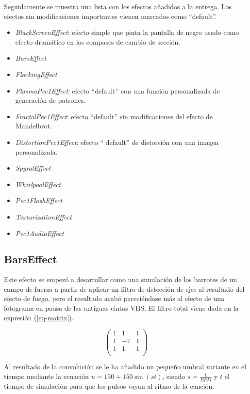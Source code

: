 \documentclass[12pt]{article}%
\begin{document}
	Seguidamente se muestra una lista con los efectos añadidos a la entrega. Los efectos sin modificaciones importantes vienen marcados como ``default''.
	
	\begin{itemize}
		\item \textit{BlackScreenEffect}: efecto simple que pinta la pantalla de negro usado como efecto dramático en los compases de cambio de sección.
		\item \textit{BarsEffect}
		\item \textit{FlockingEffect}
		\item \textit{PlasmaPec1Effect}: efecto ``default'' con una función personalizada de generación de patrones.
		\item \textit{FractalPec1Effect}: efecto ``default'' sin modificaciones del efecto de Mandelbrot.
		\item \textit{DistortionPec1Effect}: efecto `` default'' de distorsión con una imagen personalizada.
		\item \textit{SpyralEffect}
		\item \textit{WhirlpoolEffect}
		\item \textit{Pec1FlashEffect}
		\item \textit{TexturizationEffect}
		\item \textit{Pec1AudioEffect}
	\end{itemize}

\subsection{BarsEffect}
	Este efecto se empezó a desarrollar como una simulación de los barrotes de un campo de fuerza a partir de aplicar un filtro de detección de ejes al resultado del efecto de fuego, pero el resultado acabó pareciéndose más al efecto de una fotograma en pausa de las antiguas cintas VHS. El filtro total viene dada en la expresión (\ref{eq-matrix}).
	
\begin{equation}
	\begin{pmatrix}
		1 & 1 & 1 \\
		1 & -7 & 1 \\
		1 & 1 & 1 \\
	\end{pmatrix}
	\label{eq-matrix}
\end{equation}
	
	Al resultado de la convolución se le ha añadido un pequeño umbral variante en el tiempo mediante la ecuación $u=150 + 150\sin{(s t)}$, siendo $s=\frac{1}{BPM}$ y $t$ el tiempo de simulación para que los pulsos vayan al ritmo de la canción.
	
\end{document}
